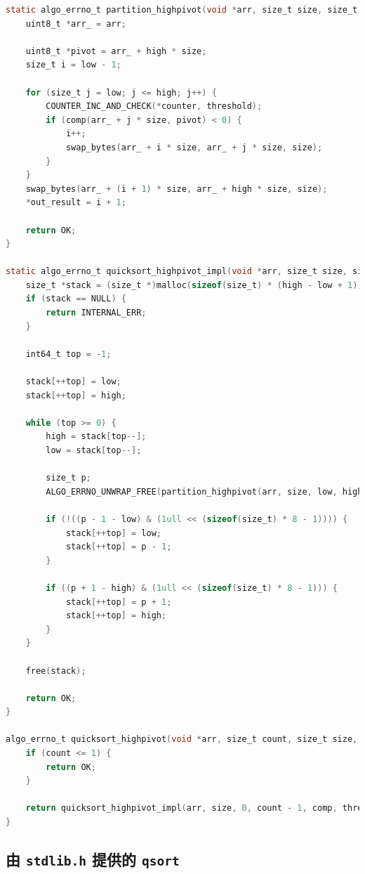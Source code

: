 \documentclass[12pt]{article}
\begin{document}
\begin{lstlisting}[language=C]
static algo_errno_t partition_highpivot(void *arr, size_t size, size_t low, size_t high, comp_t comp, uint64_t threshold, uint64_t *counter, size_t *out_result) {
    uint8_t *arr_ = arr;

    uint8_t *pivot = arr_ + high * size;
    size_t i = low - 1;

    for (size_t j = low; j <= high; j++) {
        COUNTER_INC_AND_CHECK(*counter, threshold);
        if (comp(arr_ + j * size, pivot) < 0) {
            i++;
            swap_bytes(arr_ + i * size, arr_ + j * size, size);
        }
    }
    swap_bytes(arr_ + (i + 1) * size, arr_ + high * size, size);
    *out_result = i + 1;

    return OK;
}

static algo_errno_t quicksort_highpivot_impl(void *arr, size_t size, size_t low, size_t high, comp_t comp, uint64_t threshold, uint64_t *counter) {
    size_t *stack = (size_t *)malloc(sizeof(size_t) * (high - low + 1));
    if (stack == NULL) {
        return INTERNAL_ERR;
    }

    int64_t top = -1;

    stack[++top] = low;
    stack[++top] = high;

    while (top >= 0) {
        high = stack[top--];
        low = stack[top--];

        size_t p;
        ALGO_ERRNO_UNWRAP_FREE(partition_highpivot(arr, size, low, high, comp, threshold, counter, &p), stack);

        if (!((p - 1 - low) & (1ull << (sizeof(size_t) * 8 - 1)))) {
            stack[++top] = low;
            stack[++top] = p - 1;
        }

        if ((p + 1 - high) & (1ull << (sizeof(size_t) * 8 - 1))) {
            stack[++top] = p + 1;
            stack[++top] = high;
        }
    }

    free(stack);

    return OK;
}

algo_errno_t quicksort_highpivot(void *arr, size_t count, size_t size, comp_t comp, uint64_t threshold, uint64_t *out_counter) {
    if (count <= 1) {
        return OK;
    }

    return quicksort_highpivot_impl(arr, size, 0, count - 1, comp, threshold, out_counter);
}
\end{lstlisting}

\subsection{由 \texttt{stdlib.h} 提供的 \texttt{qsort}}
\end{document}
